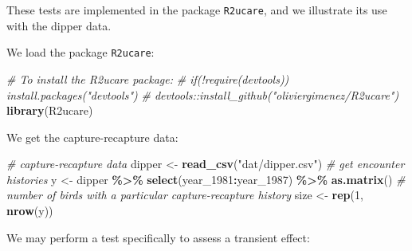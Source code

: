 \documentclass[
  12pt,
]{krantz}
\newenvironment{Shaded}{\begin{snugshade}}{\end{snugshade}}
\newcommand{\CommentTok}[1]{\textcolor[rgb]{0.56,0.35,0.01}{\textit{#1}}}
\newcommand{\DecValTok}[1]{\textcolor[rgb]{0.00,0.00,0.81}{#1}}
\newcommand{\DocumentationTok}[1]{\textcolor[rgb]{0.56,0.35,0.01}{\textbf{\textit{#1}}}}
\newcommand{\FunctionTok}[1]{\textcolor[rgb]{0.13,0.29,0.53}{\textbf{#1}}}
\newcommand{\NormalTok}[1]{#1}
\newcommand{\OtherTok}[1]{\textcolor[rgb]{0.56,0.35,0.01}{#1}}
\newcommand{\SpecialCharTok}[1]{\textcolor[rgb]{0.81,0.36,0.00}{\textbf{#1}}}
\newcommand{\StringTok}[1]{\textcolor[rgb]{0.31,0.60,0.02}{#1}}
\begin{document}
These tests are implemented in the package \texttt{R2ucare}, and we illustrate its use with the dipper data.

We load the package \texttt{R2ucare}:

\begin{Shaded}
\begin{Highlighting}[]
\CommentTok{\# To install the R2ucare package:}
\CommentTok{\# if(!require(devtools)) install.packages("devtools")}
\CommentTok{\# devtools::install\_github("oliviergimenez/R2ucare")}
\FunctionTok{library}\NormalTok{(R2ucare)}
\end{Highlighting}
\end{Shaded}

We get the capture-recapture data:

\begin{Shaded}
\begin{Highlighting}[]
\CommentTok{\# capture{-}recapture data}
\NormalTok{dipper }\OtherTok{\textless{}{-}} \FunctionTok{read\_csv}\NormalTok{(}\StringTok{"dat/dipper.csv"}\NormalTok{)}
\CommentTok{\# get encounter histories}
\NormalTok{y }\OtherTok{\textless{}{-}}\NormalTok{ dipper }\SpecialCharTok{\%\textgreater{}\%}
  \FunctionTok{select}\NormalTok{(year\_1981}\SpecialCharTok{:}\NormalTok{year\_1987) }\SpecialCharTok{\%\textgreater{}\%}
  \FunctionTok{as.matrix}\NormalTok{()}
\CommentTok{\# number of birds with a particular capture{-}recapture history}
\NormalTok{size }\OtherTok{\textless{}{-}} \FunctionTok{rep}\NormalTok{(}\DecValTok{1}\NormalTok{, }\FunctionTok{nrow}\NormalTok{(y))}
\end{Highlighting}
\end{Shaded}

We may perform a test specifically to assess a transient effect:

\begin{Shaded}
\end{Shaded}
\end{document}
